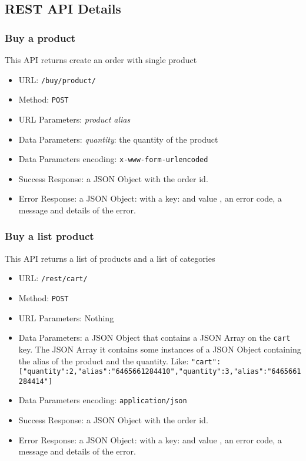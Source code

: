 \subsection{REST API Details}


\subsubsection*{Buy a product}

This API returns create an order with single product

\begin{itemize}
    \item URL: \texttt{/buy/product/}
    \item Method: \texttt{POST}
    \item URL Parameters: \textit{product alias}
    \item Data Parameters: \textit{quantity}: the quantity of the product
    \item Data Parameters encoding: \texttt{x-www-form-urlencoded}
    \item Success Response: a JSON Object with the order id.
    \item Error Response: a JSON Object: with a key:   and value , an error code, a message and details of the error.

\end{itemize}

\subsubsection*{Buy a list product}

This API returns a list of products and a list of categories

\begin{itemize}
    \item URL: \texttt{/rest/cart/}
    \item Method: \texttt{POST}
    \item URL Parameters: Nothing
    \item Data Parameters: a JSON Object that contains a JSON Array on the \texttt{cart} key. The JSON Array it contains some instances of a JSON Object  containing the alias of the product and the quantity. Like:
    \texttt{{"cart":[{"quantity":2,"alias":"6465661284410"},{"quantity":3,"alias":"6465661284414"}]}}
    \item Data Parameters encoding: \texttt{application/json}
    \item Success Response:  a JSON Object with the order id.
    \item Error Response: a JSON Object: with a key:   and value , an error code, a message and details of the error.

\end{itemize}

